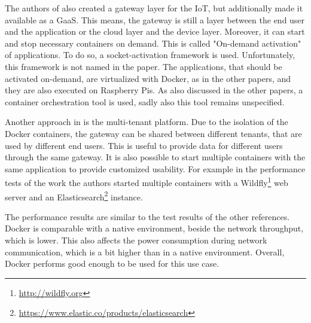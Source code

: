 The authors of \autocite{Morabito:2016} also created a gateway layer for the \ac{IoT}, but additionally made it available as a \ac{GaaS}.
This means, the gateway is still a layer between the end user and the application or the cloud layer and the device layer.
Moreover, it can start and stop necessary containers on demand.
This is called "On-demand activation" of applications.\autocite[cf.][p. 3]{Morabito:2016}
To do so, a socket-activation framework is used.\autocite[cf.][p. 3]{Morabito:2016}
Unfortunately, this framework is not named in the paper.
The applications, that should be activated on-demand, are virtualized with Docker, as in the other papers, and they are also executed on Raspberry Pis.
As also discussed in the other papers, a container orchestration tool is used, sadly also this tool remains unspecified.

Another approach in \autocite{Morabito:2016} is the multi-tenant platform.
Due to the isolation of the Docker containers, the gateway can be shared between different tenants, that are used by different end users.\autocite[cf.][p. 2]{Morabito:2016}
This is useful to provide data for different users through the same gateway.
It is also possible to start multiple containers with the same application to provide customized usability.
For example in the performance tests of the work the authors started multiple containers with a Wildfly\footnote{\url{http://wildfly.org}} web server and an Elasticsearch\footnote{\url{https://www.elastic.co/products/elasticsearch}} instance.\autocite[cf.][p. 2]{Morabito:2016}

The performance results are similar to the test results of the other references.
Docker is comparable with a native environment, beside the network throughput, which is lower.\autocite[cf.][p. 4]{Morabito:2016}
This also affects the power consumption during network communication, which is a bit higher than in a native environment.\autocite[cf.][p. 4]{Morabito:2016}
Overall, Docker performs good enough to be used for this use case.\autocite[cf.][p. 4]{Morabito:2016}
